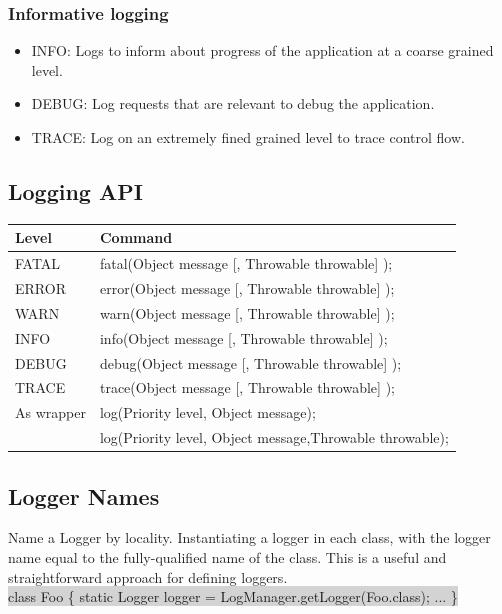 \documentclass[10pt]{article}
\newcommand\graybox[1]{\colorbox{lightgray}{\ttfamily #1}} %
\begin{document}
	\subsubsection{Informative logging}
	\begin{itemize}
		\item INFO: Logs to inform about progress of the application at a coarse grained level.
		\item DEBUG: Log requests that are relevant to debug the application.
		\item TRACE: Log on an extremely fined grained level to trace control flow.
	\end{itemize}
	
	\subsection{Logging API}	
	\begin{table}[h]
		\begin{tabular}{|l|l|}
			\hline
			\textbf{Level} & \textbf{Command} \\
			\hline
			FATAL 		& fatal(Object message [, Throwable throwable] ); \\
			\hline
			ERROR 		& error(Object message [, Throwable throwable] ); \\
			\hline
		 	WARN 		& warn(Object message [, Throwable throwable] ); \\
		 	\hline
		 	INFO 		& info(Object message [, Throwable throwable] );\\
		 	\hline
			DEBUG 		& debug(Object message [, Throwable throwable] );\\
			\hline
		 	TRACE 		& trace(Object message [, Throwable throwable] );\\
		 	\hline
		 	As wrapper 	& log(Priority level, Object message);\\
						& log(Priority level, Object message,Throwable throwable);\\
			\hline
		\end{tabular}
	\end{table}
	
	\subsection{Logger Names}
	Name a Logger by locality. Instantiating a logger in each class, with the logger name equal to the fully-qualified name of the class. This is a useful and straightforward approach for defining loggers. 
	\\
	\graybox{class Foo \{
			static Logger logger = LogManager.getLogger(Foo.class); ...
			\}
	}
\end{document}
